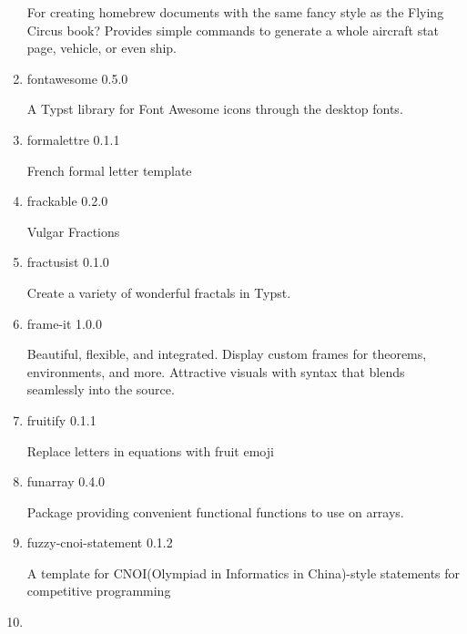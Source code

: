 \begin{enumerate}
  For creating homebrew documents with the same fancy style as the
  Flying Circus book? Provides simple commands to generate a whole
  aircraft stat page, vehicle, or even ship.
\item
  \href{/universe/package/fontawesome/}{}

  { fontawesome } { 0.5.0 }

  A Typst library for Font Awesome icons through the desktop fonts.
\item
  \href{/universe/package/formalettre/}{}


  { formalettre } { 0.1.1 }

  French formal letter template
\item
  \href{/universe/package/frackable/}{}

  { frackable } { 0.2.0 }

  Vulgar Fractions
\item
  \href{/universe/package/fractusist/}{}

  { fractusist } { 0.1.0 }

  Create a variety of wonderful fractals in Typst.
\item
  \href{/universe/package/frame-it/}{}

  { frame-it } { 1.0.0 }

  Beautiful, flexible, and integrated. Display custom frames for
  theorems, environments, and more. Attractive visuals with syntax that
  blends seamlessly into the source.
\item
  \href{/universe/package/fruitify/}{}

  { fruitify } { 0.1.1 }

  Replace letters in equations with fruit emoji
\item
  \href{/universe/package/funarray/}{}

  { funarray } { 0.4.0 }

  Package providing convenient functional functions to use on arrays.
\item
  \href{/universe/package/fuzzy-cnoi-statement/}{}


  { fuzzy-cnoi-statement } { 0.1.2 }

  A template for CNOI(Olympiad in Informatics in China)-style statements
  for competitive programming
\item
  \href{/universe/package/g-exam/}{}


\end{enumerate}
